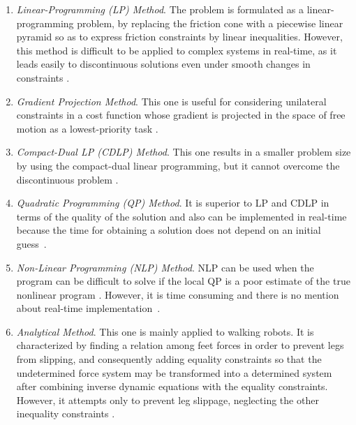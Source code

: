 		\begin{enumerate}
		
			\item \emph{Linear-Programming (LP) Method}.
						The problem is formulated as a linear-programming problem, by replacing the
						friction cone with a piecewise linear pyramid so as to express friction constraints by
						linear inequalities.
						However, this method is difficult to be applied to complex systems in real-time, as it leads
						easily to discontinuous solutions even under smooth changes in constraints
						\cite{Nahon_TransRoboticsAuto1992}.
						
			\item \emph{Gradient Projection Method}.
						This one is useful for considering unilateral constraints in a cost function whose
						gradient is projected in the space of free motion as a lowest-priority task
						\cite{Mansard_TransRobotics2009}.
						
			\item \emph{Compact-Dual LP (CDLP) Method}.
						This one results in a smaller problem size by using the compact-dual linear programming,
						but it cannot overcome the discontinuous problem \cite{Nahon_TransRoboticsAuto1992}.
						
			\item \emph{Quadratic Programming (QP) Method}.
						It is superior to LP and CDLP in terms
						of the quality of the solution and also can be implemented in real-time because the time for
						obtaining a solution does not depend on an initial guess~\cite{Chen_MIRC1999}.
						
			\item \emph{Non-Linear Programming (NLP) Method}.
						NLP can be used when the program can be difficult to solve if the local QP is	a poor estimate
						of the true nonlinear program \cite{Posa_WAFR2012}.
						However, it is time consuming and there is no mention about real-time
						implementation~\cite{Sharma_NUiCONE2011}.
						
			\item \emph{Analytical Method}.
						This one is mainly applied to walking robots.
						It is characterized by finding a relation among feet forces in order to prevent legs from
						slipping, and consequently adding equality constraints so that the undetermined force system
						may be transformed into a determined system after combining inverse dynamic equations with the
						equality constraints.
						However, it attempts only to prevent leg slippage, neglecting the other inequality constraints
						\cite{Chen_MIRC1999}.
		
		\end{enumerate}